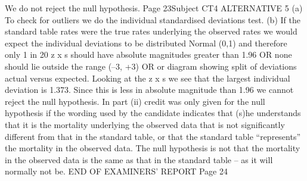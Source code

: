 We do not reject the null hypothesis.
Page 23Subject CT4 %
ALTERNATIVE 5
(a) To check for outliers we do the individual standardised
deviations test.
(b) If the standard table rates were the true rates underlying the
observed rates
we would expect the individual deviations to be distributed Normal
(0,1)
and therefore only 1 in 20 z x s should have absolute magnitudes
greater than 1.96
OR
none should lie outside the range (–3, +3)
OR
or diagram showing split of deviations actual versus expected.
Looking at the z x s we see that the largest individual deviation
is 1.373.
Since this is less in absolute magnitude than 1.96 we cannot reject the
null hypothesis.
In part (ii) credit was only given for the null hypothesis if the wording used by the candidate
indicates that (s)he understands that it is the mortality underlying the observed data that is
not significantly different from that in the standard table, or that the standard table
“represents” the mortality in the observed data. The null hypothesis is not that the mortality
in the observed data is the same as that in the standard table – as it will normally not be.
END OF EXAMINERS’ REPORT
Page 24
